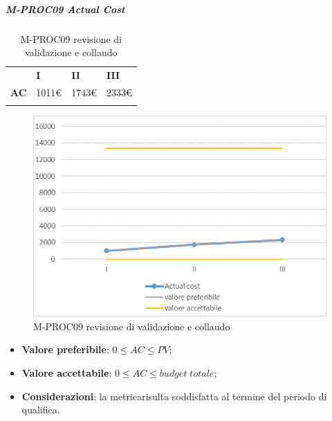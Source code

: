 \subparagraph{M-PROC09 Actual Cost} \mbox{}
\begin{longtable}[H!] {						
		>{}p{35mm}  		
		>{}p{12mm}
		>{}p{12mm}		
		>{}p{12mm}		
	}
	\rowcolor{gray!50}
	\textbf{} & \textbf{I} & \textbf{II} & \textbf{III}  \TBstrut \\ [2mm]
	\textbf{AC} & 1011\euro & 1743\euro & 2333\euro  \TBstrut \\ [2mm]
	\rowcolor{white}
	\caption{M-PROC09 revisione di validazione e collaudo}
\end{longtable}
\begin{figure}[H] 	
	\includegraphics[width=\linewidth]{./img/grafici/RA9.png}	
	\caption{M-PROC09 revisione di validazione e collaudo}	
\end{figure}
\begin{itemize}
	\item \textbf{Valore preferibile}: $0\le AC \le PV$;
	\item \textbf{Valore accettabile}: $0 \le AC \le budget \; totale$;
	\item \textbf{Considerazioni}: la metrica\glosp risulta soddisfatta al termine del periodo di qualifica.
\end{itemize}

